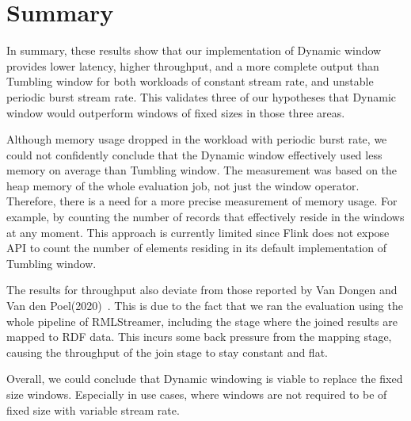 \begin{table}[htbp]
    \centering
\caption{Tumbling window's completeness measurement. 
    The \emph{Expected (triples)} are the number of triples generated by the 
bounded data processing RMLStreamer.}
\label{tab:tumbling_completeness}
\end{table}


\section{Summary}%
\label{sec:Result Summary}

In summary, these results show that our implementation of Dynamic window 
provides lower latency, higher throughput, and a more complete 
output than Tumbling window for both 
workloads of constant stream rate, and unstable periodic burst stream rate.
This validates three of our hypotheses that Dynamic window would outperform 
windows of fixed sizes in those three areas. 

Although memory usage dropped in the workload with periodic burst rate, we 
could not confidently conclude that the Dynamic window effectively used less memory
on average than Tumbling window. The measurement was based on the heap memory of the 
whole evaluation job, not just the window operator. Therefore, there is a need for a 
more precise measurement of memory usage. For example, by counting the number of 
records that effectively reside in the windows at any moment. This approach is currently 
limited since Flink does not expose API to count the number of elements residing 
in its default implementation of Tumbling window.  

The results for throughput also deviate from those reported by Van Dongen and Van den Poel(2020)~\cite{evalution_of_spe}. 
This is due to the fact that we ran the evaluation using the whole pipeline of RMLStreamer, including 
the stage where the joined results are mapped to RDF data. This incurs some back pressure from the mapping stage, 
causing the throughput of the join stage to stay constant and flat.    

Overall, we could conclude that Dynamic windowing is viable to replace the fixed size windows. Especially in use 
cases, where windows are not required to be of fixed size with variable stream rate.  

